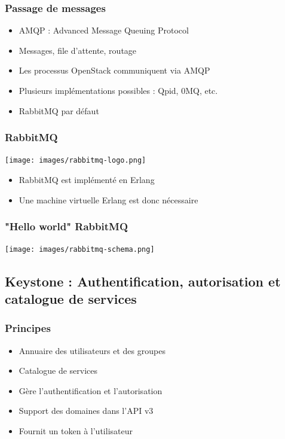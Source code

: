   \begin{frame}
    \frametitle{Passage de messages}
    \begin{itemize}
      \item AMQP : Advanced Message Queuing Protocol
      \item Messages, file d'attente, routage
      \item Les processus OpenStack communiquent via AMQP
      \item Plusieurs implémentations possibles : Qpid, 0MQ, etc.
      \item RabbitMQ par défaut
    \end{itemize}
  \end{frame}

  \begin{frame}
  \frametitle{RabbitMQ}
    \begin{center}
      \texttt{[image: images/rabbitmq-logo.png]}
    \end{center}
    \begin{itemize}
      \item RabbitMQ est implémenté en Erlang
      \item Une machine virtuelle Erlang est donc nécessaire
    \end{itemize}
  \end{frame}

  \begin{frame}
    \frametitle{"Hello world" RabbitMQ}
    \texttt{[image: images/rabbitmq-schema.png]}
  \end{frame}

  \subsection[Keystone]{Keystone : Authentification, autorisation et catalogue de services}

  \begin{frame}
    \frametitle{Principes}
    \begin{itemize}
      \item Annuaire des utilisateurs et des groupes
      \item Catalogue de services
      \item Gère l'authentification et l'autorisation
      \item Support des domaines dans l'API v3
      \item Fournit un token à l'utilisateur
    \end{itemize}
  \end{frame}

